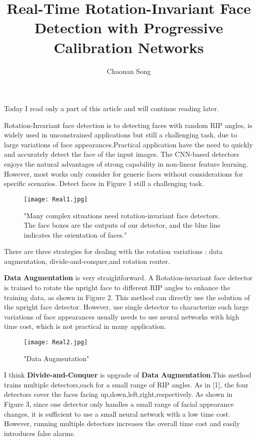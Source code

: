 \documentclass{article}
\title{Real-Time Rotation-Invariant Face Detection with Progressive Calibration Networks}
\author{Chaonan Song}
\begin{document}
\maketitle
    \par Today I read only a part of this article and will continue reading later.
    \par Rotation-Invariant face detection is to detecting faces with random RIP angles, is widely used in unconstrained applications but still a challenging task, due to large variations of face appearances.Practical application have the need to quickly and accurately detect the face of the input images. The CNN-based detectors enjoys the natural advantages of strong capability in non-linear feature learning. However, most works only consider for generic faces without considerations for specific scenarios. Detect faces in Figure 1 still a challenging task.
        \begin{figure}[H]
            \centering
            \texttt{[image: Real1.jpg]}
            \caption{"Many complex situations need rotation-invariant face detectors. The face boxes are the outputs of our detector, and the blue line indicates the orientation of faces."}
            \label{fig:1}
        \end{figure}
    \par There are three strategies for dealing with the rotation variations : data augmentation, divide-and-conquer,and rotation router.
    \par \textbf{Data Augmentation} is very straightforward. A Rotation-invariant face detector is trained to rotate the upright face to different RIP angles to enhance the training data, as shown in Figure 2. This method can directly use the solution of the upright face detector. However, use single detector to characterize such large variations of face appearances usually needs to use neural networks with high time cost, which is not practical in many application.
        \begin{figure}[H]
            \centering
            \texttt{[image: Real2.jpg]}
            \caption{"Data Augmentation"}
            \label{fig:2}
        \end{figure}
    \par I think \textbf{Divide-and-Conquer} is upgrade of \textbf{Data Augmentation}.This method trains multiple detectors,each for a small range of RIP angles. As in [1], the four detectors cover the faces facing up,down,left,right,respectively. As shown in Figure 3, since one detector only handles a small range of facial appearance changes, it is sufficient to use a small neural network with a low time cost. However, running multiple detectors increases the overall time cost and easily introduces false alarms.
\end{document}
